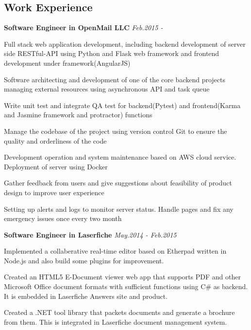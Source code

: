 \documentclass[margin,line]{resume}
\begin{document}
\begin{resume}
\section{\mystyle Work Experience}
\textbf{Software Engineer in OpenMail LLC}\hfill
\textsl{Feb.2015 - }
\begin{list2}
\item Full stack web application development, including backend development of server side RESTful-API using Python and Flask web framework and frontend development under framework(AngularJS)
\item Software architecting and development of one of the core backend projects managing external resources using asynchronous API and task queue
\item Write unit test and integrate QA test for backend(Pytest) and frontend(Karma and Jasmine framework and protractor) functions
\item Manage the codebase of the project using version control Git to ensure the quality and orderliness of the code
\item Development operation and system maintenance based on AWS cloud service. Deployment of server using Docker
\item Gather feedback from users and give suggestions about feasibility of product design to improve user experience
\item Setting up alerts and logs to monitor server status. Handle pages and fix any emergency issues once every two month
\end{list2}
\textbf{Software Engineer in Laserfiche}\hfill
\textsl{May.2014 - Feb.2015}
\begin{list2}
\item Implemented a collaberative real-time editor based on Etherpad
written in Node.js and also build some plugins for improvement.
\item Created an HTML5 E-Document viewer web app that supports PDF and other
Microsoft Office document formats with sufficient functions using C\# as
backend. It is embedded in Laserfiche Answers site and product.
\item Created a .NET tool library that packets documents and generate a brochure
from them. This is integrated in Laserfiche document management system.
\end{list2}


\end{resume}
\end{document}
